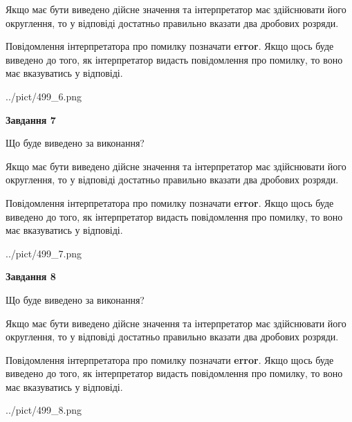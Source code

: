 \documentclass[12pt, ukrainian]{article}
\begin{document}
{\begin {Large}
Якщо має бути виведено дійсне значення та інтерпретатор має здійснювати його округлення, 
то у відповіді достатньо правильно вказати два дробових розряди.

Повідомлення інтерпретатора про помилку позначати \textbf{error}.
Якщо щось буде виведено до того, як інтерпретатор видасть повідомлення про помилку, 
то воно має вказуватись у відповіді. \par

\begin{center}
	{../pict/499_6.png}
\end{center}
\newpage

{\begin {center}\textbf{Завдання 7}\end {center}}\par
Що буде виведено за виконання? \par

Якщо має бути виведено дійсне значення та інтерпретатор має здійснювати його округлення, 
то у відповіді достатньо правильно вказати два дробових розряди.

Повідомлення інтерпретатора про помилку позначати \textbf{error}.
Якщо щось буде виведено до того, як інтерпретатор видасть повідомлення про помилку, 
то воно має вказуватись у відповіді. \par

\begin{center}
	{../pict/499_7.png}
\end{center}
\newpage

{\begin {center}\textbf{Завдання 8}\end {center}}\par
Що буде виведено за виконання? \par

Якщо має бути виведено дійсне значення та інтерпретатор має здійснювати його округлення, 
то у відповіді достатньо правильно вказати два дробових розряди.

Повідомлення інтерпретатора про помилку позначати \textbf{error}.
Якщо щось буде виведено до того, як інтерпретатор видасть повідомлення про помилку, 
то воно має вказуватись у відповіді. \par

\begin{center}
	{../pict/499_8.png}
\end{center}
\newpage


\end{Large}}
\end{document}
